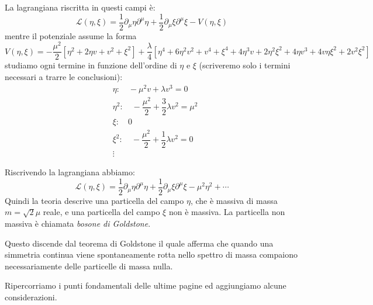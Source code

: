 La lagrangiana riscritta in questi campi è:
\begin{equation}
  \mathcal{L}(\eta,\xi)=\dfrac{1}{2}\partial_\mu\eta\partial^\mu\eta+\dfrac{1}{2}\partial_\mu\xi\partial^\mu\xi-V(\eta,\xi)
\end{equation}
mentre il potenziale assume la forma
\begin{equation}
V(\eta,\xi)=-\dfrac{\mu^2}{2}[\eta^2+2\eta v+v^2+\xi^2]+\dfrac{\lambda}{4}[\eta^4+6\eta^2v^2+v^4+\xi^4+4\eta^3v+2\eta^2\xi^2+4\eta v^3+4v\eta\xi^2+2v^2\xi^2]
\end{equation}
 studiamo ogni termine in funzione dell'ordine di $\eta$ e $\xi$ (scriveremo solo i termini necessari a trarre le conclusioni):
 \begin{equation}
\begin{aligned}
 &\eta: \quad  -\mu^2 v+\lambda v^3=0\\  
 & \eta^2:     \quad -\dfrac{\mu^2}{2}+\dfrac{3}{2}\lambda v^2=\mu^2                                              \\
 & \xi:  \quad           0             \\
 & \xi^2:\quad      -\dfrac{\mu^2}{2}+\dfrac{1}{2}\lambda v^2=0\\
&\vdots
\end{aligned}
\end{equation}

Riscrivendo la lagrangiana abbiamo:
\begin{equation}
  \mathcal{L}(\eta,\xi)=\dfrac{1}{2}\partial_\mu\eta\partial^\mu\eta+\dfrac{1}{2}\partial_\mu\xi\partial^\mu\xi-\mu^2\eta^2+\cdots
\end{equation}
Quindi la teoria descrive una particella del campo $\eta$, che è massiva di massa $m=\sqrt{2}\mu$ reale, e una particella del campo $\xi$ non è massiva. La particella non massiva è chiamata \textit{bosone di Goldstone}.

Questo discende dal teorema di Goldstone il quale afferma che quando una simmetria continua viene spontaneamente rotta nello spettro di massa compaiono necessariamente delle particelle di massa nulla.



Ripercorriamo i punti fondamentali delle ultime pagine ed aggiungiamo alcune considerazioni.


